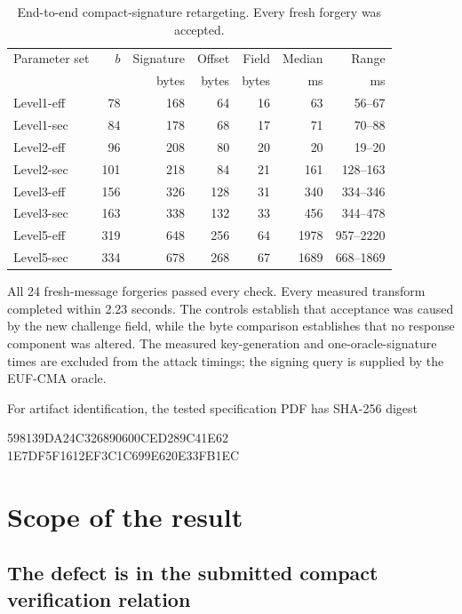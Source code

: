 \documentclass[11pt,a4paper]{article}
\begin{document}
\begin{table}[t]
\centering
\small
\caption{End-to-end compact-signature retargeting.  Every fresh forgery was accepted.}
\label{tab:results}
\begin{tabular}{@{}lrrrrrr@{}}
\toprule
Parameter set & $b$ & Signature & Offset & Field & Median & Range \\
              &     & bytes     & bytes  & bytes & ms     & ms \\
\midrule
Level1-eff &  78 & 168 &  64 & 16 &   63 &   56--67 \\
Level1-sec &  84 & 178 &  68 & 17 &   71 &   70--88 \\
Level2-eff &  96 & 208 &  80 & 20 &   20 &   19--20 \\
Level2-sec & 101 & 218 &  84 & 21 &  161 & 128--163 \\
Level3-eff & 156 & 326 & 128 & 31 &  340 & 334--346 \\
Level3-sec & 163 & 338 & 132 & 33 &  456 & 344--478 \\
Level5-eff & 319 & 648 & 256 & 64 & 1978 & 957--2220 \\
Level5-sec & 334 & 678 & 268 & 67 & 1689 & 668--1869 \\
\bottomrule
\end{tabular}
\end{table}

All 24 fresh-message forgeries passed every check.  Every measured transform completed within
2.23 seconds.  The controls establish that acceptance was caused by the new challenge field,
while the byte comparison establishes that no response component was altered.  The measured
key-generation and one-oracle-signature times are excluded from the attack timings; the signing
query is supplied by the EUF-CMA oracle.

\begin{samepage}
For artifact identification, the tested specification PDF has SHA-256 digest
\begin{center}
\small\ttfamily
598139DA24C326890600CED289C41E62\\
1E7DF5F1612EF3C1C699E620E33FB1EC
\end{center}
\end{samepage}

\section{Scope of the result}
\label{sec:scope}

\subsection{The defect is in the submitted compact verification relation}
\end{document}
